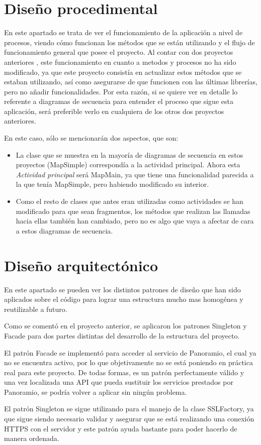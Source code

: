 
\section{Diseño procedimental}

En este apartado se trata de ver el funcionamiento de la aplicación a nivel de procesos, viendo cómo funcionan los métodos que se están utilizando y el flujo de funcionamiento general que posee el proyecto. Al contar con dos proyectos anteriores \cite{tfg1} \cite{tfm1}, este funcionamiento en cuanto a metodos y procesos no ha sido modificado, ya que este proyecto consistía en actualizar estos métodos que se estaban utilizando, así como asegurarse de que funcionen con las últimas librerías, pero no añadir funcionalidades. Por esta razón, si se quiere ver en detalle lo referente a diagramas de secuencia para entender el proceso que sigue esta aplicación, será preferible verlo en cualquiera de los otros dos proyectos anteriores.

En este caso, sólo se mencionarán dos aspectos, que son:

\begin{itemize}
\item La clase que se muestra en la mayoría de diagramas de secuencia en estos proyectos (MapSimple) correspondía a la actividad principal. Ahora esta \textit{Actividad principal} será MapMain, ya que tiene una funcionalidad parecida a la que tenía MapSimple, pero habiendo modificado su interior.
\item Como el resto de clases que antes eran utilizadas como actividades se han modificado para que sean fragmentos, los métodos que realizan las llamadas hacia ellas también han cambiado, pero no es algo que vaya a afectar de cara a estos diagramas de secuencia.
\end{itemize} 

\section{Diseño arquitectónico}

En este apartado se pueden ver los distintos patrones de diseño que han sido aplicados sobre el código para lograr una estructura mucho mas homogénea y reutilizable a futuro.

Como se comentó en el proyecto anterior, se aplicaron los patrones Singleton \cite{sing} y Facade \cite{fac} para dos partes distintas del desarrollo de la estructura del proyecto.

El patrón Facade se implementó para acceder al servicio de Panoramio, el cual ya no se encuentra activo, por lo que objetivamente no se está poniendo en práctica real para este proyecto. De todas formas, es un patrón perfectamente válido y una vez localizada una API que pueda sustituir los servicios prestados por Panoramio, se podría volver a aplicar sin ningún problema.

El patrón Singleton se sigue utilizando para el manejo de la clase SSLFactory, ya que sigue siendo necesario validar y asegurar que se está realizando una conexión HTTPS con el servidor y este patrón ayuda bastante para poder hacerlo de manera ordenada.